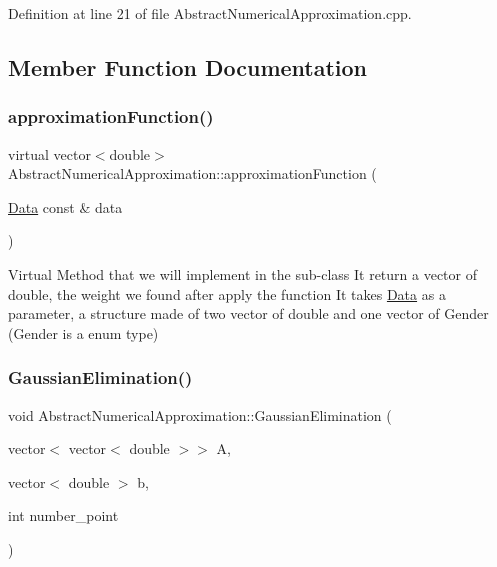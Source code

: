 Definition at line 21 of file Abstract\+Numerical\+Approximation.\+cpp.



\subsection{Member Function Documentation}
\mbox{\label{class_abstract_numerical_approximation_aaf647fb522cf0d424d31a67230e19a62}} 
\subsubsection{\texorpdfstring{approximation\+Function()}{approximationFunction()}}
{\footnotesize\ttfamily virtual vector$<$double$>$ Abstract\+Numerical\+Approximation\+::approximation\+Function (\begin{DoxyParamCaption}\item[{\mbox{\hyperlink{struct_data}{Data}} const \&}]{data }\end{DoxyParamCaption})\hspace{0.3cm}{\ttfamily [pure virtual]}}



Virtual Method that we will implement in the sub-\/class It return a vector of double, the weight we found after apply the function It takes \mbox{\hyperlink{struct_data}{Data}} as a parameter, a structure made of two vector of double and one vector of Gender (Gender is a enum type) 

\mbox{\label{class_abstract_numerical_approximation_a0e92dead9d1cc73d2e4e8c9eed2b7437}} 
\subsubsection{\texorpdfstring{Gaussian\+Elimination()}{GaussianElimination()}}
{\footnotesize\ttfamily void Abstract\+Numerical\+Approximation\+::\+Gaussian\+Elimination (\begin{DoxyParamCaption}\item[{vector$<$ vector$<$ double $>$$>$}]{A,  }\item[{vector$<$ double $>$}]{b,  }\item[{int}]{number\+\_\+point }\end{DoxyParamCaption})}



